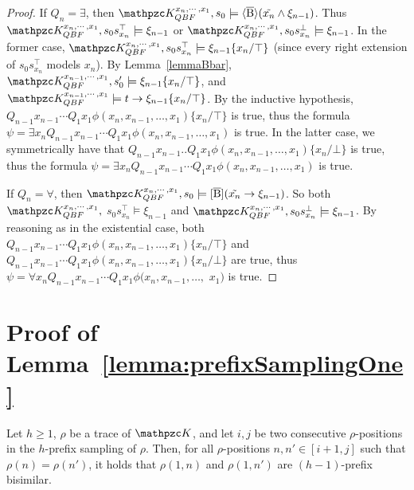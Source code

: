 \begin{proof}
If $Q_n=\exists$, then $\Ku_{QBF}^{x_n,\cdots , x_1},s_0\models \hsBt(\tilde{x_n}\wedge \xi_{n-1})$. Thus  $\Ku_{QBF}^{x_n,\cdots , x_1},s_0s_{x_n}^\top\models\xi_{n-1}$ or $\Ku_{QBF}^{x_n,\cdots , x_1},s_0s_{x_n}^\bot\models\xi_{n-1}$. In the former case, $\Ku_{QBF}^{x_n,\cdots , x_1},s_0s_{x_n}^\top\models \xi_{n-1}\{x_n/\top\}$ (since every right extension of $s_0s_{x_n}^\top$ models $x_n$). 
By Lemma~\ref{lemmaBbar}, $\Ku_{QBF}^{x_{n-1},\cdots , x_1},s_0'\models\xi_{n-1}\{x_n/\top\}$, and $\Ku_{QBF}^{x_{n-1},\cdots , x_1}\models t\rightarrow \xi_{n-1}\{x_n/\top\}$. By the inductive hypothesis, $Q_{n-1} x_{n-1} \cdots Q_1 x_1 \phi(x_n,x_{n-1},\ldots , x_1)\{x_n/\top\}$ is true, thus the formula $\psi=\exists x_n Q_{n-1} x_{n-1} \cdots Q_1 x_1 \phi(x_n,x_{n-1},\ldots , x_1)$ is true. In the latter case, we symmetrically have that $Q_{n-1} x_{n-1} .. Q_1 x_1 \phi(x_n,x_{n-1},\ldots , x_1)\{x_n/\bot\}$ is true, thus the formula $\psi=\exists x_n Q_{n-1} x_{n-1} \cdots Q_1 x_1 \phi(x_n,x_{n-1},\ldots , x_1)$ is true.

If $Q_n=\forall$, then $\Ku_{QBF}^{x_n,\cdots , x_1}, s_0 \models \hsBtu(\tilde{x_n}\rightarrow \xi_{n-1})$. So both $\Ku_{QBF}^{x_n,\cdots , x_1},$ $s_0s_{x_n}^\top\models  \xi_{n-1}$ and $\Ku_{QBF}^{x_n,\cdots , x_1},s_0s_{x_n}^\bot\models  \xi_{n-1}$.
By reasoning as in the existential case, both  
$Q_{n-1} x_{n-1} \cdots Q_1 x_1 \phi(x_n,x_{n-1},\ldots , x_1)\{x_n/\top\}$ and
$Q_{n-1} x_{n-1} \!\cdots Q_1 x_1 \phi(x_n,x_{n-1},\ldots ,\allowbreak x_1)\{x_n/\bot\}$ are true, thus $\psi=\forall x_n Q_{n-1} x_{n-1} \cdots  Q_1 x_1 \phi(x_n,x_{n-1},\ldots ,$ $x_1)$ is true.
\end{proof}


\section{Proof of Lemma~\ref{lemma:prefixSamplingOne}}\label{proof:lemma:prefixSamplingOne}

\begin{lemma*}[\ref{lemma:prefixSamplingOne}] Let $h\geq 1$, $\rho$ be a trace of $\Ku$, and let $i,j$ be two consecutive $\rho$-positions in the $h$-prefix sampling of $\rho$.
Then, for all $\rho$-positions $n,n'\in [i+1,j]$ such that $\rho(n)=\rho(n')$, it holds that $\rho(1,n)$ and $\rho(1,n')$ are $(h-1)$-prefix bisimilar.
\end{lemma*}

